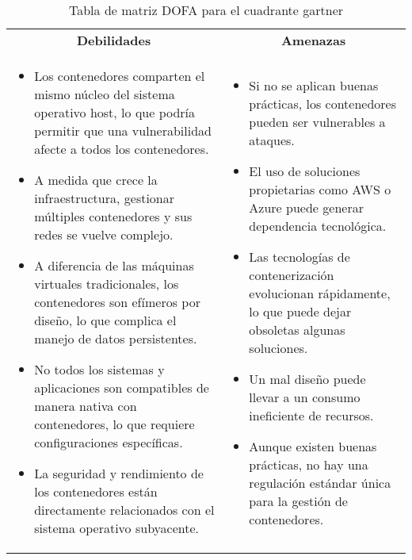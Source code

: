 \begin{table}[H]
\begin{tabularx}{\textwidth}{|X|X|}
\begin{minipage}[t]{\linewidth}
\vspace{2pt}
\end{minipage}
\\
\hline
\multicolumn{1}{|c|}{\textbf{Debilidades}} & \multicolumn{1}{c|}{\textbf{Amenazas}} \\
\hline
\begin{minipage}[t]{\linewidth}
\vspace{2pt}
\begin{itemize}
    \setlength\itemsep{0pt}
    \setlength\parskip{0pt}
    \setlength\parsep{0pt}
    \item Los contenedores comparten el mismo núcleo del sistema operativo host, lo que podría permitir que una vulnerabilidad afecte a todos los contenedores.
    \item A medida que crece la infraestructura, gestionar múltiples contenedores y sus redes se vuelve complejo.
    \item A diferencia de las máquinas virtuales tradicionales, los contenedores son efímeros por diseño, lo que complica el manejo de datos persistentes.
    \item No todos los sistemas y aplicaciones son compatibles de manera nativa con contenedores, lo que requiere configuraciones específicas.
    \item La seguridad y rendimiento de los contenedores están directamente relacionados con el sistema operativo subyacente.
\end{itemize}
\vspace{2pt}
\end{minipage}
&
\begin{minipage}[t]{\linewidth}
\vspace{2pt}
\begin{itemize}
    \setlength\itemsep{0pt}
    \setlength\parskip{0pt}
    \setlength\parsep{0pt}
    \item Si no se aplican buenas prácticas, los contenedores pueden ser vulnerables a ataques.
    \item El uso de soluciones propietarias como AWS o Azure puede generar dependencia tecnológica.
    \item Las tecnologías de contenerización evolucionan rápidamente, lo que puede dejar obsoletas algunas soluciones.
    \item Un mal diseño puede llevar a un consumo ineficiente de recursos.
    \item Aunque existen buenas prácticas, no hay una regulación estándar única para la gestión de contenedores.
\end{itemize}
\vspace{2pt}
\end{minipage}
\\
\hline
\end{tabularx}
\caption{Tabla de matriz DOFA para el cuadrante gartner}
\label{tab:matriz-dofa}
\end{table}